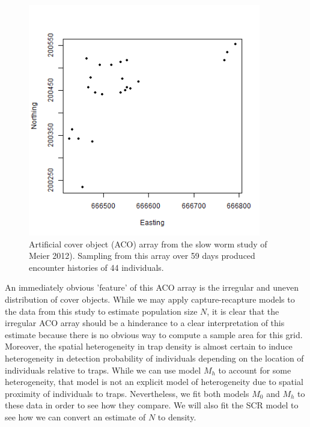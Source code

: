 \documentclass{book}
\begin{document}
\begin{figure}[h]
\centering
\includegraphics[height=4in,width=4in]{traps.png}
\caption{
Artificial cover object (ACO) array from the slow worm study of Meier
2012).  Sampling from this array over 59 days produced encounter
histories of 44 individuals.
}
\label{fig.fig1}
\end{figure}

An immediately obvious 'feature' of this ACO array is the irregular
and uneven distribution of cover objects.  While we may apply
capture-recapture models to the data from this study to estimate
population size $N$, it is clear that the irregular ACO array should
be a hinderance to a clear interpretation of this estimate because
there is no obvious way to compute a sample area for this
grid. Moreover, the spatial heterogeneity in trap density is almost
certain to induce heterogeneity in detection probability of
individuals depending on the location of individuals relative to
traps. While we can use model $M_h$ to account for some heterogeneity,
that model is not an explicit model of heterogeneity due to spatial
proximity of individuals to traps. Nevertheless, we fit both models
$M_0$ and $M_h$ to these data in order to see how they compare.  We
will also fit the SCR model to see how we can convert an estimate of
$N$ to density.
\end{document}
